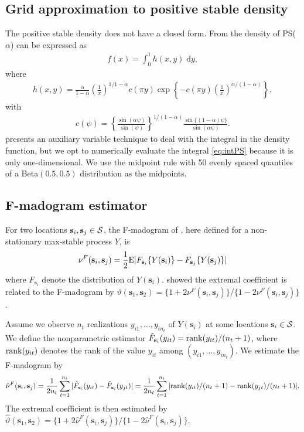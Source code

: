 \documentclass[12pt]{article}
\newcommand{\bs}{\ensuremath{\mathbf{s}}}
\newcommand{\dd}{\; \text{d} }
\newcommand{\calS}{{\cal S}}
\begin{document}
\subsection{Grid approximation to positive stable density} \label{eba:gridapprox}
The positive stable density does not have a closed form. From \citet[Section 2]{Stephenson2009} the density of PS($\alpha$) can be expressed as
\begin{align}\label{eq:intPS}
f(x) = \int_0^1 h(x, y) \dd y,
\end{align}
where
\begin{align*}
h(x, y) = \frac{\alpha}{1 - \alpha} \left( \frac{1}{x} \right)^{1 / 1 - \alpha} c(\pi y) \exp \left\{ - c(\pi y) \left(\frac{1}{x}\right)^{\alpha / (1 - \alpha)} \right\},
\end{align*}
with
\begin{align*}
c(\psi) = \left\{\frac{\sin(\alpha \psi)}{\sin(\psi)}\right\}^{1 / (1 - \alpha)} \frac{\sin\{(1 - \alpha) \psi\}}{\sin(\alpha \psi)}.
\end{align*}
\citet{Stephenson2009} presents an auxiliary variable technique to deal with the integral in the density function, but we opt to numerically evaluate the integral \eqref{eq:intPS} because it is only one-dimensional. 
We use the midpoint rule with 50 evenly spaced quantiles of a Beta$(0.5, 0.5)$ distribution as the midpoints.

\subsection{F-madogram estimator} \label{eba:fmado}
For two locations $\bs_i,\bs_j\in\calS$, the F-madogram of \citet{Cooley2006}, here defined for a non-stationary max-stable process $Y$, is
$$
\nu^{F}(\bs_i,\bs_j) = \dfrac12 {\rm E}| F_{\bs_i}\{Y(\bs_i)\} - F_{\bs_j}\{Y(\bs_j)\} |
$$
where $F_{\bs_i}$ denote the distribution of $Y(\bs_i)$. \citet{Cooley2006} showed the extremal coefficient is related to the F-madogram by $\vartheta(\bs_1,\bs_2)=\{1+2\nu^{F}(\bs_i,\bs_j)\}/\{1-2\nu^{F}(\bs_i,\bs_j)\}$.

Assume we observe $n_t$ realizations $y_{i1},\ldots,y_{in_t}$ of $Y(\bs_i)$ at some locations $\bs_i\in\calS$. We define the nonparametric estimator $\hat F_{\bs_i}(y_{it})={\rm rank}(y_{it})/(n_t+1)$, where ${\rm rank}(y_{it})$ denotes the rank of the value $y_{it}$ among $(y_{i1},\ldots,y_{in_t})$. We estimate the F-madogram by
$$
\hat\nu^{F}(\bs_i,\bs_j) = \dfrac1{2n_t}  \sum_{t=1}^{n_t} | \hat F_{\bs_i}(y_{it}) - \hat F_{\bs_i}(y_{jt}) | = \dfrac1{2n_t}  \sum_{t=1}^{n_t} | {\rm rank}(y_{it})/(n_t+1) - {\rm rank}(y_{jt})/(n_t+1) |.
$$
The extremal coefficient is then estimated by $\hat\vartheta(\bs_1,\bs_2)=\{1+2\hat\nu^{F}(\bs_i,\bs_j)\}/\{1-2\hat\nu^{F}(\bs_i,\bs_j)\}$.
\end{document}
